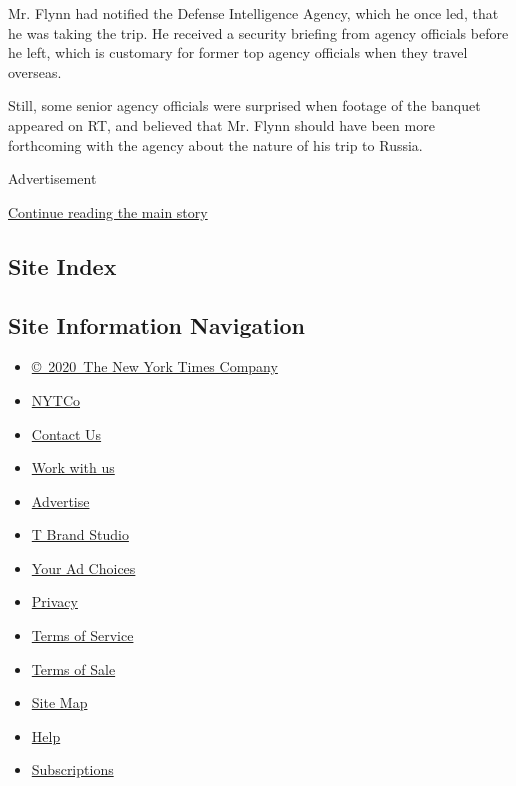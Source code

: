 Mr. Flynn had notified the Defense Intelligence Agency, which he once
led, that he was taking the trip. He received a security briefing from
agency officials before he left, which is customary for former top
agency officials when they travel overseas.

Still, some senior agency officials were surprised when footage of the
banquet appeared on RT, and believed that Mr. Flynn should have been
more forthcoming with the agency about the nature of his trip to Russia.

Advertisement

\protect\hyperlink{after-bottom}{Continue reading the main story}

\hypertarget{site-index}{%
\subsection{Site Index}\label{site-index}}

\hypertarget{site-information-navigation}{%
\subsection{Site Information
Navigation}\label{site-information-navigation}}

\begin{itemize}
\tightlist
\item
  \href{https://help.nytimes.com/hc/en-us/articles/115014792127-Copyright-notice}{©~2020~The
  New York Times Company}
\end{itemize}

\begin{itemize}
\tightlist
\item
  \href{https://www.nytco.com/}{NYTCo}
\item
  \href{https://help.nytimes.com/hc/en-us/articles/115015385887-Contact-Us}{Contact
  Us}
\item
  \href{https://www.nytco.com/careers/}{Work with us}
\item
  \href{https://nytmediakit.com/}{Advertise}
\item
  \href{http://www.tbrandstudio.com/}{T Brand Studio}
\item
  \href{https://www.nytimes.com/privacy/cookie-policy\#how-do-i-manage-trackers}{Your
  Ad Choices}
\item
  \href{https://www.nytimes.com/privacy}{Privacy}
\item
  \href{https://help.nytimes.com/hc/en-us/articles/115014893428-Terms-of-service}{Terms
  of Service}
\item
  \href{https://help.nytimes.com/hc/en-us/articles/115014893968-Terms-of-sale}{Terms
  of Sale}
\item
  \href{https://spiderbites.nytimes.com}{Site Map}
\item
  \href{https://help.nytimes.com/hc/en-us}{Help}
\item
  \href{https://www.nytimes.com/subscription?campaignId=37WXW}{Subscriptions}
\end{itemize}
